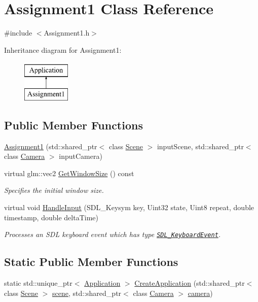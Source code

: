 \hypertarget{class_assignment1}{}\section{Assignment1 Class Reference}
\label{class_assignment1}


{\ttfamily \#include $<$Assignment1.\+h$>$}

Inheritance diagram for Assignment1\+:\begin{figure}[H]
\begin{center}
\leavevmode
\includegraphics[height=2.000000cm]{class_assignment1}
\end{center}
\end{figure}
\subsection*{Public Member Functions}
\begin{DoxyCompactItemize}
\item 
\hyperlink{class_assignment1_ade9ef18c233dab37d37f20760fe7674d}{Assignment1} (std\+::shared\+\_\+ptr$<$ class \hyperlink{class_scene}{Scene} $>$ input\+Scene, std\+::shared\+\_\+ptr$<$ class \hyperlink{class_camera}{Camera} $>$ input\+Camera)
\item 
virtual glm\+::vec2 \hyperlink{class_assignment1_a581b6c897c918eede3f9bbb1cbc50320}{Get\+Window\+Size} () const
\begin{DoxyCompactList}\small\item\em Specifies the initial window size. \end{DoxyCompactList}\item 
virtual void \hyperlink{class_assignment1_ab9db4f51e177dd72130cd61d86b97535}{Handle\+Input} (S\+D\+L\+\_\+\+Keysym key, Uint32 state, Uint8 repeat, double timestamp, double delta\+Time)
\begin{DoxyCompactList}\small\item\em Processes an S\+DL keyboard event which has type \href{https://wiki.libsdl.org/SDL_KeyboardEvent}{\tt S\+D\+L\+\_\+\+Keyboard\+Event}. \end{DoxyCompactList}\end{DoxyCompactItemize}
\subsection*{Static Public Member Functions}
\begin{DoxyCompactItemize}
\item 
static std\+::unique\+\_\+ptr$<$ \hyperlink{class_application}{Application} $>$ \hyperlink{class_assignment1_ae1952b4904620a16c4f2c098bf061c68}{Create\+Application} (std\+::shared\+\_\+ptr$<$ class \hyperlink{class_scene}{Scene} $>$ \hyperlink{class_application_a88c6615107a5094bb93fa5f153f79554}{scene}, std\+::shared\+\_\+ptr$<$ class \hyperlink{class_camera}{Camera} $>$ \hyperlink{class_application_a0e8589fcb13c520ba472473abe5a518d}{camera})
\end{DoxyCompactItemize}

